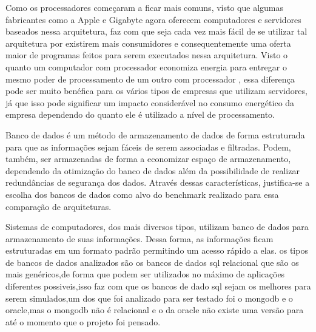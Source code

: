 \documentclass[
	12pt,				%
	openright,			%
	oneside,			%
	a4paper,			%
	english,			%
	french,				%
	spanish,			%
	brazil,				%
	]{abntex2}
\begin{document}
Como os processadores  começaram a ficar mais comuns, visto que algumas fabricantes como a Apple e Gigabyte agora oferecem computadores e servidores baseados nessa arquitetura, faz com que seja cada vez mais fácil de se utilizar tal arquitetura por existirem mais consumidores e consequentemente uma oferta maior de programas feitos para serem executados nessa arquitetura. Visto o quanto um computador com processador  economiza energia para entregar o mesmo poder de processamento de um outro com processador , essa diferença pode ser muito benéfica para os vários tipos de empresas que utilizam servidores, já que isso pode significar um impacto considerável no consumo energético da empresa dependendo do quanto ele é utilizado a nível de processamento.\newline

Banco de dados é um método de armazenamento de dados de forma estruturada para que as informações sejam fáceis de serem associadas e filtradas. Podem, também, ser armazenadas de forma a economizar espaço de armazenamento, dependendo da otimização do banco de dados além da possibilidade de realizar redundâncias de segurança dos dados. Através dessas características, justifica-se a escolha dos bancos de dados como alvo do benchmark realizado para essa comparação de arquiteturas.

Sistemas de computadores, dos mais diversos tipos, utilizam banco de dados para armazenamento de suas informações. Dessa forma, as informações ficam estruturadas em um formato padrão permitindo um acesso rápido a elas.
os tipos de bancos de dados analizados são os bancos de dados sql relacional que são os mais genéricos,de forma que podem ser utilizados no máximo de aplicações diferentes possiveis,isso faz com que os bancos de dado sql sejam os melhores para serem simulados,um dos que foi analizado para ser testado foi o mongodb e o oracle,mas o mongodb não é relacional e o da oracle não existe uma versão para  até o momento que o projeto foi pensado.
\end{document}
